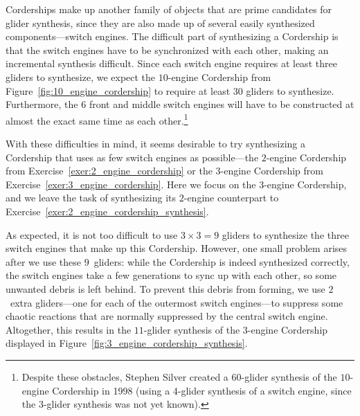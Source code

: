 Corderships make up another family of objects that are prime candidates for glider synthesis, since they are also made up of several easily synthesized components---switch engines. The difficult part of synthesizing a Cordership is that the switch engines have to be synchronized with each other, making an incremental synthesis difficult. Since each switch engine requires at least three gliders to synthesize, we expect the $10$-engine Cordership from Figure~\ref{fig:10_engine_cordership} to require at least $30$ gliders to synthesize. Furthermore, the $6$ front and middle switch engines will have to be constructed at almost the exact same time as each other.\footnote{Despite these obstacles, Stephen Silver created a $60$-glider synthesis of the $10$-engine Cordership in 1998 (using a 4-glider synthesis of a switch engine, since the 3-glider synthesis was not yet known).}

With these difficulties in mind, it seems desirable to try synthesizing a Cordership that uses as few switch engines as possible---the $2$-engine Cordership from Exercise~\ref{exer:2_engine_cordership} or the $3$-engine Cordership from Exercise~\ref{exer:3_engine_cordership}. Here we focus on the $3$-engine Cordership, and we leave the task of synthesizing its $2$-engine counterpart to Exercise~\ref{exer:2_engine_cordership_synthesis}.

As expected, it is not too difficult to use $3 \times 3 = 9$ gliders to synthesize the three switch engines that make up this Cordership. However, one small problem arises after we use these $9$~gliders: while the Cordership is indeed synthesized correctly, the switch engines take a few generations to sync up with each other, so some unwanted debris is left behind. To prevent this debris from forming, we use $2$~extra gliders---one for each of the outermost switch engines---to suppress some chaotic reactions that are normally suppressed by the central switch engine. Altogether, this results in the $11$-glider synthesis of the $3$-engine Cordership displayed in Figure~\ref{fig:3_engine_cordership_synthesis}.

